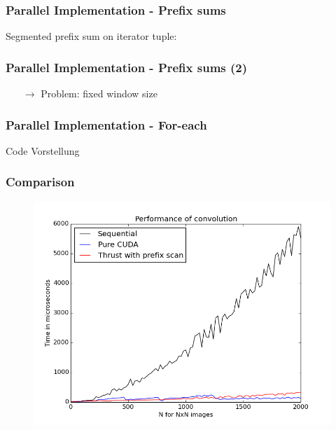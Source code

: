\documentclass{beamer}
\begin{document}
\begin{frame}
\frametitle{Parallel Implementation - Prefix sums}
Segmented prefix sum on iterator tuple:


   
\end{frame}

\begin{frame}
\frametitle{Parallel Implementation - Prefix sums (2)}

\begin{enumerate}
\item[$\to$] Problem: fixed window size
\end{enumerate}

\end{frame}

\begin{frame}
\frametitle{Parallel Implementation - For-each}

Code Vorstellung
\end{frame}

\begin{frame}
\frametitle{Comparison}
\begin{figure}
\centering
    \includegraphics[scale=0.4]{imgs/performance.png}
    
    \end{figure}
\end{frame}
\end{document}

